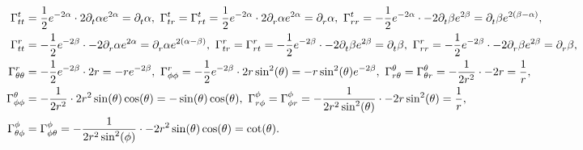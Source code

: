 \begin{align*}
	\chris{t}{t}{t} &= \frac{1}{2}e^{-2\alpha}\cdot 2\del{t}{\alpha}e^{2\alpha} = \del{t}{\alpha}, \ \chris{t}{t}{r} = \chris{t}{r}{t} = \frac{1}{2}e^{-2\alpha}\cdot 2\del{r}{\alpha}e^{2\alpha} = \del{r}{\alpha},\ \chris{t}{r}{r} = -\frac{1}{2}e^{-2\alpha}\cdot -2\del{t}{\beta}e^{2\beta} = \del{t}{\beta}e^{2(\beta - \alpha)}, \\
	\chris{r}{t}{t} &= -\frac{1}{2}e^{-2\beta}\cdot -2\del{r}{\alpha}e^{2\alpha} = \del{r}{\alpha}e^{2(\alpha - \beta)},\ \chris{r}{t}{r} = \chris{r}{r}{t} = -\frac{1}{2}e^{-2\beta}\cdot -2\del{t}{\beta}e^{2\beta} = \del{t}{\beta},\ \chris{r}{r}{r} = -\frac{1}{2}e^{-2\beta}\cdot -2\del{r}{\beta}e^{2\beta} = \del{r}{\beta}, \\
	\chris{r}{\theta}{\theta} &= -\frac{1}{2}e^{-2\beta}\cdot 2r = -re^{-2\beta},\ \chris{r}{\phi}{\phi} = -\frac{1}{2}e^{-2\beta}\cdot 2r\sin[2](\theta) = -r\sin[2](\theta)e^{-2\beta},\ \chris{\theta}{r}{\theta} = \chris{\theta}{\theta}{r} = -\frac{1}{2r^{2}}\cdot -2r = \frac{1}{r}, \\
	\chris{\theta}{\phi}{\phi} &= -\frac{1}{2r^{2}}\cdot 2r^{2}\sin(\theta)\cos(\theta) = -\sin(\theta)\cos(\theta),\ \chris{\phi}{r}{\phi} = \chris{\phi}{\phi}{r} = -\frac{1}{2r^{2}\sin[2](\theta)}\cdot -2r\sin[2](\theta) = \frac{1}{r}, \\
	\chris{\phi}{\theta}{\phi} &= \chris{\phi}{\phi}{\theta} = -\frac{1}{2r^{2}\sin[2](\phi)}\cdot -2r^{2}\sin(\theta)\cos(\theta) = \cot(\theta).
\end{align*}

